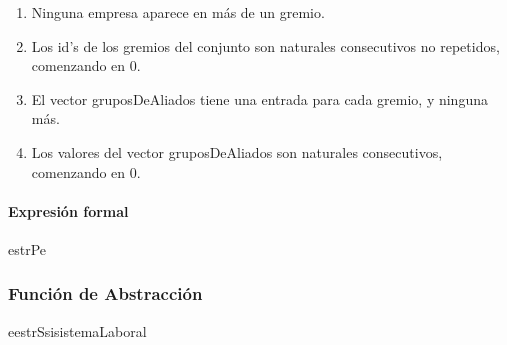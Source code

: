 \begin{enumerate}
	\item Ninguna empresa aparece en más de un gremio.
	\item Los id's de los gremios del conjunto son naturales consecutivos no repetidos, comenzando en 0.
	\item El vector gruposDeAliados tiene una entrada para cada gremio, y ninguna m\'as.
	\item Los valores del vector gruposDeAliados son naturales consecutivos, comenzando en 0.
\end{enumerate}

\paragraph{Expresión formal \\}
\begin{RepFormal}{estrP}{e}
\end{RepFormal}

\subsubsection{Funci\'on de Abstracci\'on}

\begin{FunAbsDescriptiva}{e}{estrS}{si}{sistemaLaboral}



\end{FunAbsDescriptiva}

